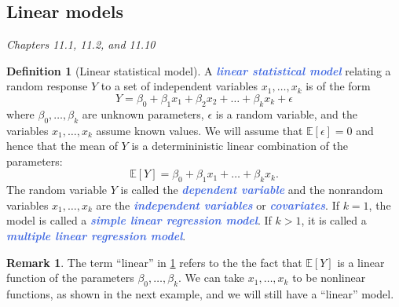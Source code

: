 \documentclass[10pt]{article}
\theoremstyle{definition}
\newtheorem{definition}[theorem]{Definition}
\newtheorem{remark}[theorem]{Remark}
\newcommand{\1}[1]{\textbf{1}_{\left[#1\right]}} %
\def\E{\mathbb{E}} %
\newcommand{\demph}[1]{\textcolor{RoyalBlue}{\textbf{\slshape #1}}} %
\begin{document}
\subsection{Linear models}
\textit{Chapters 11.1, 11.2, and 11.10}

\begin{definition}[Linear statistical model]
  \label{def:linear-statistical-model}
  A \demph{linear statistical model} relating a random response $Y$ to a set of
  independent variables $x_{1},\ldots,x_{k}$ is of the form
  \begin{equation*}
    Y = \beta_{0}+\beta_{1}x_{1}+\beta_{2}x_{2}+\ldots+\beta_{k}x_{k}+\epsilon
  \end{equation*}
  where $\beta_{0},\ldots,\beta_{k}$ are unknown parameters, $\epsilon$ is a
  random variable, and the variables $x_{1},\ldots,x_{k}$ assume known values.
  We will assume that $\E\left[\epsilon \right]=0$ and hence that the mean of
  $Y$ is a determininistic linear combination of the parameters:
  \begin{equation*}
    \E\left[Y \right]= \beta_{0}+\beta_{1}x_{1}+\ldots+\beta_{k}x_{k}.
  \end{equation*}
  The random variable $Y$ is called the \demph{dependent variable} and the
  nonrandom variables $x_{1},\ldots,x_{k}$ are the \demph{independent
    variables} or \demph{covariates}.
  If $k=1$, the model is called a \demph{simple linear regression model}. If
  $k>1$, it is called a \demph{multiple linear regression model}.
\end{definition}

\begin{remark}
  The term ``linear'' in \cref{def:linear-statistical-model} refers to the the
  fact that $\E\left[Y \right]$ is a linear function of the parameters
  $\beta_{0},\ldots,\beta_{k}$. We can take $x_{1},\ldots,x_{k}$ to be
  nonlinear functions, as shown in the next example, and we will still have a
  ``linear'' model.
\end{remark}
\end{document}
